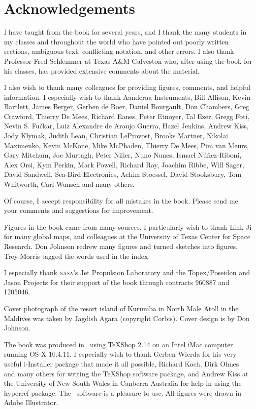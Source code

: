 \section*{Acknowledgements}
I have taught from the book for several years, and I thank the many
students in my classes and throughout the world who have pointed out
poorly written sections, ambiguous text, conflicting notation, and
other errors.  I also thank Professor Fred Schlemmer at Texas A\&M
Galveston who, after using the book for his classes, has provided
extensive comments about the material.

I also wish to thank many colleagues for providing figures, comments,
and helpful information. I especially wish to thank Aanderaa
Instruments, Bill Allison, Kevin Bartlett, James Berger, Gerben de
Boer, Daniel Bourgault, Don Chambers, Greg Crawford, Thierry De Mees,
Richard Eanes, Peter Etnoyer, Tal Ezer, Gregg Foti, Nevin
S. Fu\v{c}kar, Luiz Alexandre de Araujo Guerra, Hazel Jenkins, Andrew
Kiss, Jody Klymak, Judith Lean, Christian LeProvost, Brooks Martner,
Nikolai Maximenko, Kevin McKone, Mike McPhaden, Thierry De Mees, Pim
van Meurs, Gary Mitchum, Joe Murtagh, Peter Niiler, Nuno Nunes, Ismael
N\'{u}\~{n}ez-Riboni, Alex Orsi, Kym Perkin, Mark Powell, Richard Ray,
Joachim Ribbe, Will Sager, David Sandwell, Sea-Bird Electronics, Achim
Stoessel, David Stooksbury, Tom Whitworth, Carl Wunsch and many
others.

Of course, I accept responsibility for all mistakes in the
book. Please send me your comments and suggestions for improvement.

Figures in the book came from many sources. I particularly wish to
thank Link Ji for many global maps, and colleagues at the University
of Texas Center for Space Research. Don Johnson redrew many figures
and turned sketches into figures. Trey Morris tagged the words used in
the index.

I especially thank \textsc{nasa}'s Jet Propulsion Laboratory and the
Topex/Poseidon and Jason Projects for their support of the book
through contracts 960887 and 1205046.

Cover photograph of the resort island of Kurumba in North Male Atoll
in the Maldives was taken by Jagdish Agara (copyright Corbis). Cover
design is by Don Johnson.

The book was produced in \LaTeXe\ using TeXShop 2.14 on an Intel iMac
computer running OS-X 10.4.11. I especially wish to thank Gerben
Wierda for his very useful i-Installer package that made it all
possible, Richard Koch, Dirk Olmes and many others for writing the
TeXShop software package, and Andrew Kiss at the University of New
South Wales in Canberra Australia for help in using the hyperref
package. The \LaTeXe\ software is a pleasure to use. All figures were
drawn in Adobe Illustrator.
